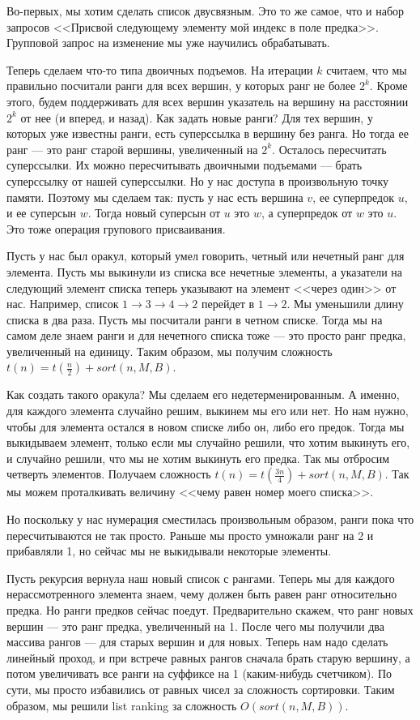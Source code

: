 \documentclass[12pt]{article}
\begin{document}
Во-первых, мы хотим сделать список двусвязным. Это то же самое, что и набор запросов <<Присвой следующему элементу мой индекс в поле предка>>. Групповой запрос на изменение мы уже научились обрабатывать.

Теперь сделаем что-то типа двоичных подъемов. На итерации $k$ считаем, что мы правильно посчитали ранги для всех вершин, у которых ранг не более $2^k$. Кроме этого, будем поддерживать для всех вершин указатель на вершину на расстоянии $2^k$ от нее (и вперед, и назад). Как задать новые ранги? Для тех вершин, у которых уже известны ранги, есть суперссылка в вершину без ранга. Но тогда ее ранг --- это ранг старой вершины, увеличенный на $2^k$. Осталось пересчитать суперссылки. Их можно пересчитывать двоичными подъемами --- брать суперссылку от нашей суперссылки. Но у нас доступа в произвольную точку памяти. Поэтому мы сделаем так: пусть у нас есть вершина $v$, ее суперпредок $u$, и ее суперсын $w$. Тогда новый суперсын от $u$ это $w$, а суперпредок от $w$ это $u$. Это тоже операция групового присваивания.


Пусть у нас был оракул, который умел говорить, четный или нечетный ранг для элемента. Пусть мы выкинули из списка все нечетные элементы, а указатели на следующий элемент списка теперь указывают на элемент <<через один>> от нас. Например, список $1 \rightarrow 3 \rightarrow 4 \rightarrow 2$ перейдет в $1 \rightarrow 2$. Мы уменьшили длину списка в два раза. Пусть мы посчитали ранги в четном списке. Тогда мы на самом деле знаем ранги и для нечетного списка тоже --- это просто ранг предка, увеличенный на единицу. Таким образом, мы получим сложность $t(n) = t(\frac{n}{2}) + sort(n, M, B)$.

Как создать такого оракула? Мы сделаем его недетерменированным. А именно, для каждого элемента случайно решим, выкинем мы его или нет. Но нам нужно, чтобы для элемента остался в новом списке либо он, либо его предок. Тогда мы выкидываем элемент, только если мы случайно решили, что хотим выкинуть его, и случайно решили, что мы не хотим выкинуть его предка. Так мы отбросим четверть элементов. Получаем сложность $t(n) = t(\frac{3n}{4}) + sort(n, M, B)$. Так мы можем проталкивать величину <<чему равен номер моего списка>>.

Но поскольку у нас нумерация сместилась произвольным образом, ранги пока что пересчитываются не так просто. Раньше мы просто умножали ранг на 2 и прибавляли 1, но сейчас мы не выкидывали некоторые элементы.

Пусть рекурсия вернула наш новый список с рангами. Теперь мы для каждого нерассмотренного элемента знаем, чему должен быть равен ранг относительно предка. Но ранги предков сейчас поедут. Предварительно скажем, что ранг новых вершин --- это ранг предка, увеличенный на 1. После чего мы получили два массива рангов --- для старых вершин и для новых. Теперь нам надо сделать линейный проход, и при встрече равных рангов сначала брать старую вершину, а потом увеличивать все ранги на суффиксе на 1 (каким-нибудь счетчиком). По сути, мы просто избавились от равных чисел за сложность сортировки. Таким образом, мы решили list ranking за сложность $O(sort(n, M, B))$.
\end{document}

